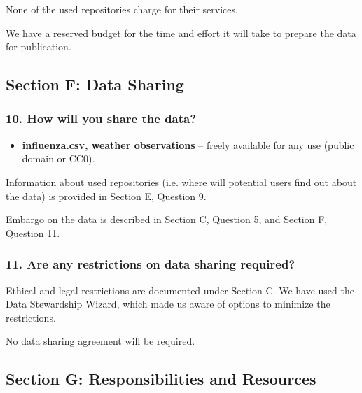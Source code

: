 \documentclass[
]{article}
\providecommand{\tightlist}{%
  \setlength{\itemsep}{0pt}\setlength{\parskip}{0pt}}
\begin{document}
None of the used repositories charge for their services.

We have a reserved budget for the time and effort it will take to
prepare the data for publication.

\hypertarget{sec-data-sharing}{}
\hypertarget{section-f-data-sharing}{%
\subsection{Section F: Data Sharing}\label{section-f-data-sharing}}

\hypertarget{q-how-share}{}
\hypertarget{how-will-you-share-the-data}{%
\subsubsection{10. How will you share the
data?}\label{how-will-you-share-the-data}}

\begin{itemize}
\tightlist
\item
  \textbf{\href{https://www.data.gv.at/katalog/dataset/grippemeldedienst-stadt-wien}{influenza.csv}, \href{https://www.meteoblue.com/en/weather/archive/export/vienna_austria_2761369}{weather observations}} {--} freely available for
  any use (public domain or CC0).
\end{itemize}

Information about used repositories (i.e. where will potential users
find out about the data) is provided in Section E, Question 9.

Embargo on the data is described in Section C, Question 5, and Section
F, Question 11.

\hypertarget{q-restrictions}{}
\hypertarget{are-any-restrictions-on-data-sharing-required}{%
\subsubsection{11. Are any restrictions on data sharing
required?}\label{are-any-restrictions-on-data-sharing-required}}

Ethical and legal restrictions are documented under Section C. We have
used the Data Stewardship Wizard, which made us aware of options to
minimize the restrictions.

No data sharing agreement will be required.

\hypertarget{sec-responsibilities-resources}{}
\hypertarget{section-g-responsibilities-and-resources}{%
\subsection{Section G: Responsibilities and
Resources}\label{section-g-responsibilities-and-resources}}
\end{document}
